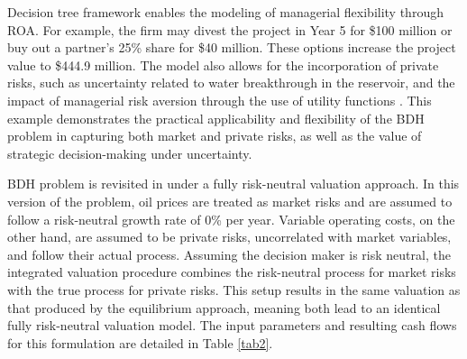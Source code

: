 \documentclass[pdflatex,sn-basic]{sn-jnl}%
\theoremstyle{thmstyleone}%
\theoremstyle{thmstyletwo}%
\theoremstyle{thmstylethree}%
\begin{document}
Decision tree framework enables the modeling of managerial flexibility through ROA. For example, the firm may divest the project in Year 5 for \$100 million or buy out a partner's 25\% share for \$40 million. These options increase the project value to \$444.9 million. The model also allows for the incorporation of private risks, such as uncertainty related to water breakthrough in the reservoir, and the impact of managerial risk aversion through the use of utility functions \citep{ref12a}. This example demonstrates the practical applicability and flexibility of the BDH problem in capturing both market and private risks, as well as the value of strategic decision-making under uncertainty.

BDH problem is revisited in \cite{ref13} under a fully risk-neutral valuation approach. In this version of the problem, oil prices are treated as market risks and are assumed to follow a risk-neutral growth rate of 0\% per year. Variable operating costs, on the other hand, are assumed to be private risks, uncorrelated with market variables, and follow their actual process. Assuming the decision maker is risk neutral, the integrated valuation procedure combines the risk-neutral process for market risks with the true process for private risks. This setup results in the same valuation as that produced by the equilibrium approach, meaning both lead to an identical fully risk-neutral valuation model. The input parameters and resulting cash flows for this formulation are detailed in Table \ref{tab2}.
\end{document}
